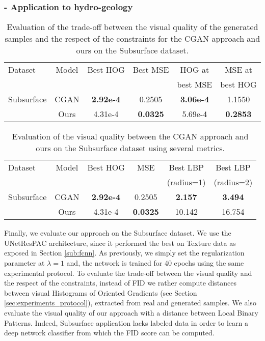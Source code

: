 \subsubsection{- Application to hydro-geology}
\label{subs:subsurface}

\begin{table}
	\centering
	\begin{tabular}{l c c c c c}
		\Bigrule
		Dataset &Model           & Best \ac{HOG} & Best \ac{MSE}& \ac{HOG} at & \ac{MSE} at \\
		&&& &  best \ac{MSE} & best \ac{HOG} \\
		\bigrule
		Subsurface &CGAN   & \textbf{2.92e-4} & 0.2505 & \textbf{3.06e-4}  & 1.1550 \\
		&Ours            & 4.31e-4 & \textbf{0.0325}& 5.69e-4 & \textbf{0.2853} \\
	\end{tabular}
	\caption[Evaluation of the trade-off between the visual quality of the respect of the constraints for the Subsurface dataset]{Evaluation of the trade-off between the visual quality of the generated samples and the respect of the constraints for the CGAN approach and ours on the Subsurface dataset.}
	\label{tab:subsurface}
\end{table}

\begin{table}[t]
	\centering
	\begin{tabular}{l c c c c c}
		\Bigrule
		Dataset &Model           & Best \ac{HOG} &  \ac{MSE}& Best \ac{LBP} & Best \ac{LBP} \\
		&&& & (radius=1) & (radius=2) \\
		\bigrule
		Subsurface &CGAN   & \textbf{2.92e-4} & 0.2505 & \textbf{2.157} & \textbf{3.494}\\
		&Ours            &  4.31e-4 &\textbf{0.0325} & 10.142 & 16.754 \\

	\end{tabular}
	\caption[Evaluation of the visual quality on the Subsurface dataset]{Evaluation of the visual quality between the CGAN approach and ours on the Subsurface dataset using several metrics.}
	\label{tab:subsurface_visual}
\end{table}

Finally, we evaluate our approach on the Subsurface dataset. We use the UNetResPAC  architecture, since it performed the best on Texture data as exposed in Section \ref{sub:fcnn}. As previously, we simply set the regularization parameter at $\lambda=1$ and, the network is trained for 40 epochs using the same experimental protocol. To evaluate the trade-off between the visual quality and the respect of the constraints, instead of FID we rather compute distances between visual Histograms of Oriented Gradients (see Section \ref{sec:experiments_protocol}), extracted from real and generated samples. We also evaluate the visual quality of our approach with a distance between Local Binary Patterns. Indeed, Subsurface application lacks labeled data in order to learn a deep network classifier from which the FID score can be computed. 

